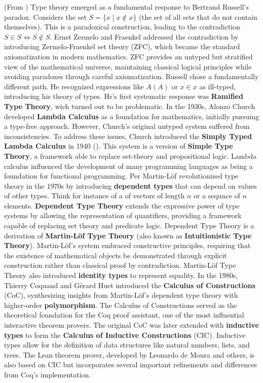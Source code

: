 (From \cite{carneiro2019typetheorylean})
Type theory emerged as a fundamental response to Bertrand Russell's paradox. 
Considers the set $S = \{x \mid x \notin x\}$ 
(the set of all sets that do not contain themselves). This is a paradoxical construction, 
leading to the contradiction $S \in S \iff S \notin S$. 
Ernst Zermelo and Fraenkel addressed the contradiction by introducing Zermelo-Fraenkel set theory (ZFC), 
which became the standard axiomatization in modern mathematics. 
ZFC provides an untyped but stratified view of the mathematical universe, 
maintaining classical logical principles while avoiding paradoxes through careful axiomatization.
Russell chose a fundamentally different path. He recognized expressions 
like $A(A)$ or $x \in x$ as ill-typed, introducing his theory of types.
Hs's first systematic response was \textbf{Ramified Type Theory}, wich turned out to be problematic.
In the 1930s, Alonzo Church developed \textbf{Lambda Calculus} as a foundation for mathematics, 
initially pursuing a type-free approach. However, Church's original untyped system suffered from 
inconsistencies. To address these issues, 
Church introduced the \textbf{Simply Typed Lambda Calculus} in 1940 (\cite{church1940formulation}).  
This system is a version of \textbf{Simple Type Theory}, a framework able to replace 
set-theory and propositional logic.
Lambda calculus influenced the development of many programming languages as being a foundation for
functional programming.
Per Martin-L\"{o}f revolutionized type theory in the 1970s by introducing 
\textbf{dependent types} that can depend on values of other types.
Think for instance of a of vectors of length $n$ or a sequnce of $n$ elements.
\textbf{Dependent Type Theory} extends the expressive power of type systems 
by allowing the representation of quantifiers, 
providing a framework capable of replacing set theory and predicate logic.
Dependent Type Theory is a derivation of \textbf{Martin-L\"{o}f Type Theory} 
(also known as \textbf{Intuitionistic Type Theory}).
Martin-L\"{o}f's system embraced constructive principles, requiring that the existence of mathematical 
objects be demonstrated through explicit construction rather than classical proof by contradiction. 
Martin-L\"{o}f Type Theory also introduced \textbf{identity types} to represent equality.
In the 1980s, Thierry Coquand and G\'{e}rard Huet introduced the \textbf{Calculus of Constructions} (CoC), 
synthesizing insights from Martin-L\"{o}f's dependent type theory with higher-order \textbf{polymorphism}. 
The Calculus of Constructions served as the theoretical foundation for the Coq proof assistant, 
one of the most influential interactive theorem provers.
The original CoC was later extended with \textbf{inductive types} to form the 
\textbf{Calculus of Inductive Constructions} (CIC). Inductive types allow for the definition 
of data structures like natural numbers, lists, and trees. 
The Lean theorem prover, developed by Leonardo de Moura and others, is also based on CIC 
but incorporates several important refinements and differences from Coq's implementation. 

